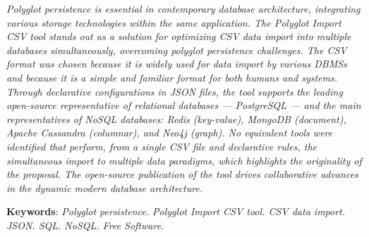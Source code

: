 \documentclass[
  12pt,
  oneside,
  a4paper,
  chapter=TITLE,
  section=TITLE,
  english,
  brazil,
]{abntex2}
\begin{document}
\begin{resumo}

  \rmfamily\itshape
  Polyglot persistence is essential in contemporary database architecture, integrating
  various storage technologies within the same application. The \textit{Polyglot Import CSV}
  tool stands out as a solution for optimizing CSV data import into multiple databases
  simultaneously, overcoming polyglot persistence challenges. The CSV format was chosen
  because it is widely used for data import by various DBMSs and because it is a simple
  and familiar format for both humans and systems. Through declarative configurations in
  JSON files, the tool supports the leading open-source representative of relational
  databases --- PostgreSQL --- and the main representatives of NoSQL databases: Redis
  (key-value), MongoDB (document), Apache Cassandra (columnar), and Neo4j (graph). No
  equivalent tools were identified that perform, from a single CSV file and declarative
  rules, the simultaneous import to multiple data paradigms, which highlights the
  originality of the proposal. The open-source publication of the tool drives collaborative
  advances in the dynamic modern database architecture.

  \vspace{\onelineskip}

  \noindent
  {\rmfamily\upshape\textbf{Keywords}}: \textit{Polyglot persistence.
  Polyglot Import CSV tool. CSV data import. JSON. SQL. NoSQL. Free Software.}
\end{resumo}


\listoffigures*
\cleardoublepage

\listoftables*
\cleardoublepage
\end{document}
